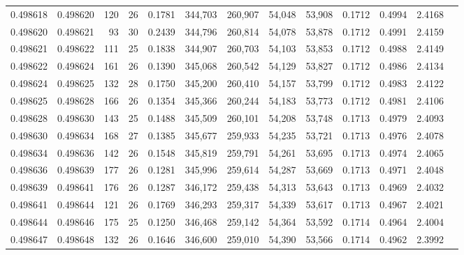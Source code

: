\begin{tabular}{rrrrrrrrrrrrr}
0.498618 & 0.498620 & 120 &  26 &                                     0.1781 & 344,703 & 260,907 &  54,048 &  53,908 & 0.1712 & 0.4994 & 2.4168 \\
0.498620 & 0.498621 &  93 &  30 &                                     0.2439 & 344,796 & 260,814 &  54,078 &  53,878 & 0.1712 & 0.4991 & 2.4159 \\
0.498621 & 0.498622 & 111 &  25 &                                     0.1838 & 344,907 & 260,703 &  54,103 &  53,853 & 0.1712 & 0.4988 & 2.4149 \\
0.498622 & 0.498624 & 161 &  26 &                                     0.1390 & 345,068 & 260,542 &  54,129 &  53,827 & 0.1712 & 0.4986 & 2.4134 \\
0.498624 & 0.498625 & 132 &  28 &                                     0.1750 & 345,200 & 260,410 &  54,157 &  53,799 & 0.1712 & 0.4983 & 2.4122 \\
0.498625 & 0.498628 & 166 &  26 &                                     0.1354 & 345,366 & 260,244 &  54,183 &  53,773 & 0.1712 & 0.4981 & 2.4106 \\
0.498628 & 0.498630 & 143 &  25 &                                     0.1488 & 345,509 & 260,101 &  54,208 &  53,748 & 0.1713 & 0.4979 & 2.4093 \\
0.498630 & 0.498634 & 168 &  27 &                                     0.1385 & 345,677 & 259,933 &  54,235 &  53,721 & 0.1713 & 0.4976 & 2.4078 \\
0.498634 & 0.498636 & 142 &  26 &                                     0.1548 & 345,819 & 259,791 &  54,261 &  53,695 & 0.1713 & 0.4974 & 2.4065 \\
0.498636 & 0.498639 & 177 &  26 &                                     0.1281 & 345,996 & 259,614 &  54,287 &  53,669 & 0.1713 & 0.4971 & 2.4048 \\
0.498639 & 0.498641 & 176 &  26 &                                     0.1287 & 346,172 & 259,438 &  54,313 &  53,643 & 0.1713 & 0.4969 & 2.4032 \\
0.498641 & 0.498644 & 121 &  26 &                                     0.1769 & 346,293 & 259,317 &  54,339 &  53,617 & 0.1713 & 0.4967 & 2.4021 \\
0.498644 & 0.498646 & 175 &  25 &                                     0.1250 & 346,468 & 259,142 &  54,364 &  53,592 & 0.1714 & 0.4964 & 2.4004 \\
0.498647 & 0.498648 & 132 &  26 &                                     0.1646 & 346,600 & 259,010 &  54,390 &  53,566 & 0.1714 & 0.4962 & 2.3992 \\

\end{tabular}
